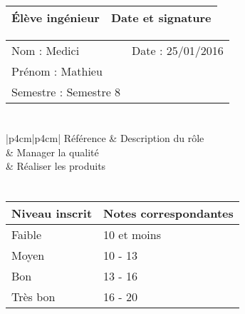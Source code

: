 \documentclass[11pt]{article}
\begin{document}

\begin{center}
\begin{table}[!hp]

	\begin{tabularx}{\linewidth}{|X|X|}
	\hline
	\rowcolor{gray!40} Élève ingénieur & Date et signature \\
	\hline
	\end{tabularx}
	\begin{tabularx}{\linewidth}{|X|X|}
	Nom : Medici & Date : 25/01/2016 \\ 
	Prénom : Mathieu & \\
	Semestre : Semestre 8 & \\
	\hline
	\end{tabularx}
\end{table}
\end{center}

\section*{\large\FR}

\centering
	\begin{longtable}{|p{4cm}|p{4cm}|}
	\hline
	 Référence \WBSCourt & Description du rôle \\
	 & Manager la qualité \\
	 & Réaliser les produits \\
	 \hline
	\end{longtable}


\section*{\large\FC}


\begin{table}[!hp]
\centering
	\begin{tabularx}{\linewidth}{|X|X|}
	\hline
	\rowcolor{gray!40} Niveau inscrit & Notes correspondantes \\
	\hline
	 Faible & 10 et moins \\
	 \hline
	 Moyen & 10 - 13 \\
	 \hline
	 Bon & 13 - 16 \\
	 \hline
	 Très bon & 16 - 20 \\
	 \hline
	\end{tabularx}
\end{table}
\end{document}
